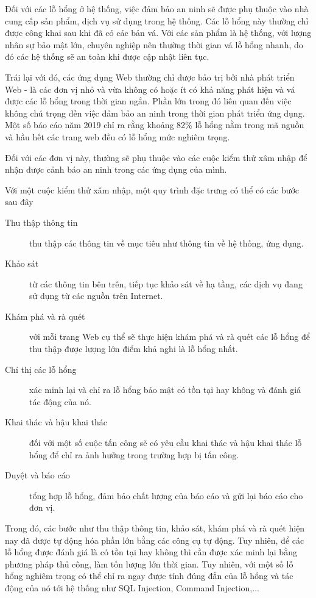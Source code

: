 \documentclass[./../main.tex]{subfiles}
\begin{document}
Đối với các lỗ hổng ở hệ thống, việc đảm bảo an ninh sẽ được phụ thuộc vào nhà cung
cấp sản phẩm, dịch vụ sử dụng trong hệ thống. Các lỗ hổng này thường chỉ được công
khai sau khi đã có các bản vá. Với các sản phẩm là hệ thống, với lượng nhân sự bảo
mật lớn, chuyên nghiệp nên thường thời gian vá lỗ hổng nhanh, do đó các hệ thống
sẽ an toàn khi được cập nhật liên tục.

Trái lại với đó, các ứng dụng Web thường chỉ được bảo trị bởi nhà phát triển Web -
là các đơn vị nhỏ và vừa không có hoặc ít có khả năng phát hiện và vá được các
lỗ hổng trong thời gian ngắn. Phần lớn trong đó liên quan đến việc không chú trọng đến việc đảm bảo an
ninh trong thời gian phát triển ứng dụng. Một số
báo cáo năm 2019 chỉ ra rằng khoảng 82\% lỗ hổng nằm trong mã nguồn và hầu hết các
trang web đều có lỗ hổng mức nghiêm trọng.

Đối với các đơn vị này, thường sẽ phụ thuộc vào các cuộc kiểm thử xâm nhập để nhận được
cảnh báo an ninh trong các ứng dụng của mình.

Với một cuộc kiểm thử xâm nhập, một quy trình đặc trưng có thể có các bước sau đây
\begin{description}
	\item [Thu thập thông tin] thu thập các thông tin về mục tiêu như thông tin về hệ thống, ứng dụng.
	\item [Khảo sát] từ các thông tin bên trên, tiếp tục khảo sát về hạ tầng, các dịch vụ đang sử dụng từ các nguồn trên Internet.
	\item [Khám phá và rà quét] với mỗi trang Web cụ thể sẽ thực hiện khám phá và rà quét các lỗ hổng để thu thập được lượng lớn điểm khả nghi là lỗ hổng nhất.
	\item [Chỉ thị các lỗ hổng] xác minh lại và chỉ ra lỗ hổng bảo mật có tồn tại hay không và đánh giá tác động của nó.
	\item [Khai thác và hậu khai thác] đối với một số cuộc tấn công sẽ có yêu cầu khai thác và hậu khai thác lỗ hổng để chỉ ra ảnh hưởng trong trường hợp bị tấn công.
	\item [Duyệt và báo cáo] tổng hợp lỗ hổng, đảm bảo chất lượng của báo cáo và gửi lại báo cáo cho đơn vị.
\end{description}
Trong đó, các bước như thu thập thông tin, khảo sát, khám phá và rà quét hiện nay
đã được tự động hóa phần lớn bằng các công cụ tự động. Tuy nhiên, để các lỗ hổng được đánh giá
là có tồn tại hay không thì cần được xác minh lại bằng phương pháp thủ công, làm
tốn lượng lớn thời gian. Tuy nhiên, với một số lỗ hổng nghiêm trọng có thể chỉ ra
ngay được tính đúng đắn của lỗ hổng và tác động của nó tới hệ thống như SQL
Injection, Command Injection,...
\end{document}
